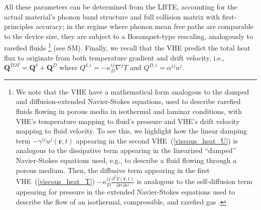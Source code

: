 \documentclass[
prb,
twocolumn,
superscriptaddress,
 amsmath,amssymb,
 aps,
longbibliography,
]{revtex4-2}
\begin{document}
All these parameters can be determined from the LBTE, accounting for the actual material’s phonon band structure and full collision matrix with first-principles accuracy; in the regime where phonon mean free paths are comparable to the device size, they are subject to a Bosanquet-type rescaling, analogously to rarefied fluids \cite{michalis_rarefaction_2010}\footnote{We note that the VHE have a mathematical form analogous to the damped and diffusion-extended Navier-Stokes equations, used to describe rarefied fluids flowing in porous media in isothermal and laminar conditions, with VHE's temperature mapping to fluid's pressure and VHE's drift velocity mapping to fluid velocity.
To see this, we highlight how the linear damping term $-\gamma^{ij}u^j(\bm{r},t)$ appearing in the second VHE~(\ref{viscous_heat_U}) is analogous to the dissipative term appearing in the linearized ``damped'' Navier-Stokes equations \cite{balasubramanian_darcys_1987,dardis_lattice_1998,bresch_existence_2003,cai_weak_2008,zhang_uniqueness_2011} used, e.g., to describe a fluid flowing through a porous medium.
Then, the diffusive term appearing in the first VHE~(\ref{viscous_heat_T}) $-\kappa_D^{ij}\tfrac{\partial^2 T(\bm{r},t)}{\partial r^i\partial r^j}$ is analogous to the self-diffusion term appearing for pressure in the extended Navier-Stokes equations \cite{brenner_navierstokes_2005,sambasivam_numerical_2014,schwarz_openfoam_2023} used to describe the flow of an isothermal, compressible, and rarefied gas \cite{maurer_second-order_2003,dongari_pressure-driven_2009}.} (see SM).
Finally, we recall that the VHE predict the total heat flux to originate from both
 temperature gradient and drift velocity, i.e., $\bm{Q}^{TOT}{=}\bm{Q}^{\delta}{+}\bm{Q}^{D}$ where ${Q}^{\delta,i}{=}{-} \kappa^{ij}_D\nabla^j T$ and ${Q}^{D,i}{=}\alpha^{ij}u^j$.
\end{document}
